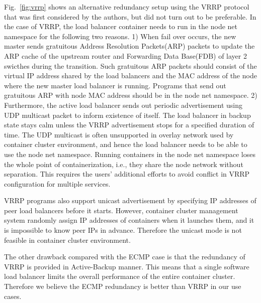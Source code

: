 Fig.~\ref{fig:vrrp} shows an alternative redundancy setup using the VRRP protocol that was first considered by the authors, but did not turn out to be preferable.
In the case of VRRP, the load balancer container needs to run in the node net namespace for the following two reasons.
1) When fail over occurs, the new master sends gratuitous Address Resolution Packets(ARP) packets to update the ARP cache of the upstream router and Forwarding Data Base(FDB) of layer 2 swicthes during the transition.
Such gratuitous ARP packets should consist of the virtual IP address shared by the load balancers and the MAC address of the node where the new master load balancer is running.
Programs that send out gratuitous ARP with node MAC address should be in the node net namespace.
%
2) Furthermore, the active load balancer sends out periodic advertisement using UDP multicast packet to inform existence of itself.
The load balancer in backup state stays calm unless the VRRP advertisement stops for a specified duration of time.
The UDP multicast is often unsupported in overlay network used by container cluster environment, and hence the load balancer needs to be able to use the node net namespace.
%
Running containers in the node net namespace loses the whole point of containerization, i.e., they share the node network without separation.
This requires the users' additional efforts to avoid conflict in VRRP configuration for multiple services.
%

VRRP programs also support unicast advertisement by specifying IP addresses of peer load balancers before it starts.
However, container cluster management system randomly assign IP addresses of containers when it launches them, and it is impossible to know peer IPs in advance. 
Therefore the unicast mode is not feasible in container cluster environment.

The other drawback compared with the ECMP case is that the redundancy of VRRP is provided in Active-Backup manner.
This means that a single software load balancer limits the overall performance of the entire container cluster.
Therefore we believe the ECMP redundancy is better than VRRP in our use cases.

